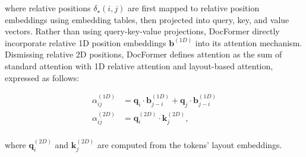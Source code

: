     
\noindent where relative positions $\delta_{\star}(i, j)$ are first mapped to relative position embeddings using embedding tables, then projected into query, key, and value vectors. Rather than using query-key-value projections, DocFormer directly incorporate relative 1D position embeddings $\bm{b}^{(1D)}$ into its attention mechanism. Dismissing relative 2D positions, DocFormer defines attention as the sum of standard attention with 1D relative attention and layout-based attention, expressed as follows:

\begin{equation}
    \begin{aligned}
        \alpha^{(1D)}_{ij} &= \bm{q}_i \cdot \bm{b}^{(1D)}_{j-i} + \bm{q}_j \cdot \bm{b}^{(1D)}_{j-i} \\
        \alpha^{(2D)}_{ij} &= \bm{q}^{(2D)}_i \cdot \bm{k}^{(2D)}_j, \\
\end{aligned}
\label{equation:docformer-attention}
\end{equation}

\noindent where $\bm{q}^{(2D)}_i$ and $\bm{k}^{(2D)}_j$ are computed from the tokens' layout embeddings. 


